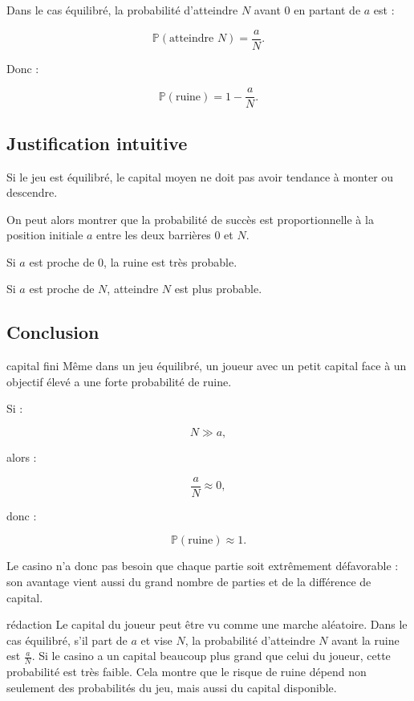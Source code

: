 \documentclass[11pt,a4paper]{article}
\newcommand{\Prob}{\mathbb{P}}
\begin{document}
Dans le cas équilibré, la probabilité d'atteindre $N$ avant $0$ en partant de $a$ est :

\[
\Prob(\text{atteindre }N)=\frac{a}{N}.
\]

Donc :

\[
\Prob(\text{ruine})=1-\frac{a}{N}.
\]

\subsection{Justification intuitive}

Si le jeu est équilibré, le capital moyen ne doit pas avoir tendance à monter ou descendre.

On peut alors montrer que la probabilité de succès est proportionnelle à la position initiale $a$ entre les deux barrières $0$ et $N$.

Si $a$ est proche de $0$, la ruine est très probable.

Si $a$ est proche de $N$, atteindre $N$ est plus probable.

\subsection{Conclusion}

\begin{conclusionbox}{capital fini}
Même dans un jeu équilibré, un joueur avec un petit capital face à un objectif élevé a une forte probabilité de ruine.

Si :

\[
N\gg a,
\]

alors :

\[
\frac{a}{N}\approx 0,
\]

donc :

\[
\Prob(\text{ruine})\approx 1.
\]

Le casino n'a donc pas besoin que chaque partie soit extrêmement défavorable : son avantage vient aussi du grand nombre de parties et de la différence de capital.
\end{conclusionbox}

\begin{oral}{rédaction}
Le capital du joueur peut être vu comme une marche aléatoire. Dans le cas équilibré, s'il part de $a$ et vise $N$, la probabilité d'atteindre $N$ avant la ruine est $\frac{a}{N}$. Si le casino a un capital beaucoup plus grand que celui du joueur, cette probabilité est très faible. Cela montre que le risque de ruine dépend non seulement des probabilités du jeu, mais aussi du capital disponible.
\end{oral}
\end{document}
